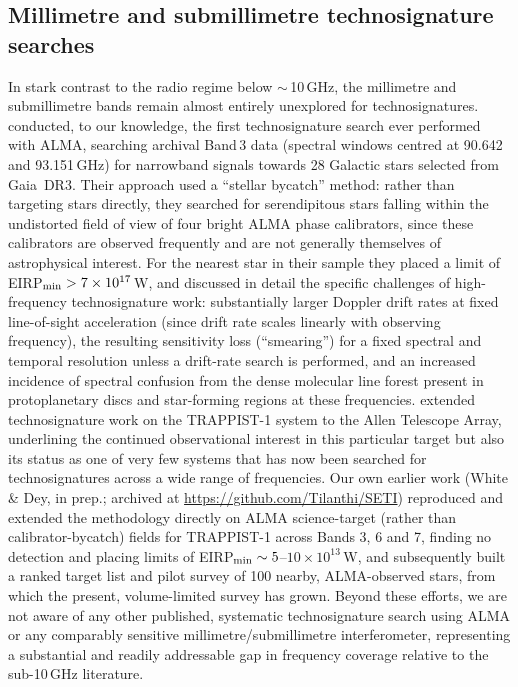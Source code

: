 \documentclass{openjournal}
\begin{document}
\subsection{Millimetre and submillimetre technosignature searches}
\label{sec:mmsubmm}

In stark contrast to the radio regime below $\sim$\,10\,GHz, the millimetre and
submillimetre bands remain almost entirely unexplored for technosignatures.
\citet{Mason2024} conducted, to our knowledge, the first technosignature search
ever performed with ALMA, searching archival Band\,3 data (spectral windows
centred at 90.642 and 93.151\,GHz) for narrowband signals towards 28 Galactic
stars selected from Gaia~DR3. Their approach used a ``stellar bycatch'' method:
rather than targeting stars directly, they searched for serendipitous stars
falling within the undistorted field of view of four bright ALMA phase
calibrators, since these calibrators are observed frequently and are not
generally themselves of astrophysical interest. For the nearest star in their
sample they placed a limit of EIRP$_{\rm min} > 7\times10^{17}$\,W, and discussed
in detail the specific challenges of high-frequency technosignature work:
substantially larger Doppler drift rates at fixed line-of-sight acceleration
(since drift rate scales linearly with observing frequency), the resulting
sensitivity loss (``smearing'') for a fixed spectral and temporal resolution
unless a drift-rate search is performed, and an increased incidence of spectral
confusion from the dense molecular line forest present in protoplanetary discs
and star-forming regions at these frequencies. \citet{ATATRAPPIST2024} extended
technosignature work on the TRAPPIST-1 system to the Allen Telescope Array,
underlining the continued observational interest in this particular target but
also its status as one of very few systems that has now been searched for
technosignatures across a wide range of frequencies. Our own earlier work (White
\& Dey, in prep.; archived at
\url{https://github.com/Tilanthi/SETI}) reproduced and extended the
\citet{Mason2024} methodology directly on ALMA science-target (rather than
calibrator-bycatch) fields for TRAPPIST-1 across Bands 3, 6 and 7, finding no
detection and placing limits of EIRP$_{\rm min}\sim5$--$10\times10^{13}$\,W, and
subsequently built a ranked target list and pilot survey of 100 nearby,
ALMA-observed stars, from which the present, volume-limited survey has grown.
Beyond these efforts, we are not aware of any other published, systematic
technosignature search using ALMA or any comparably sensitive
millimetre/submillimetre interferometer, representing a substantial and readily
addressable gap in frequency coverage relative to the sub-10\,GHz literature.
\end{document}
